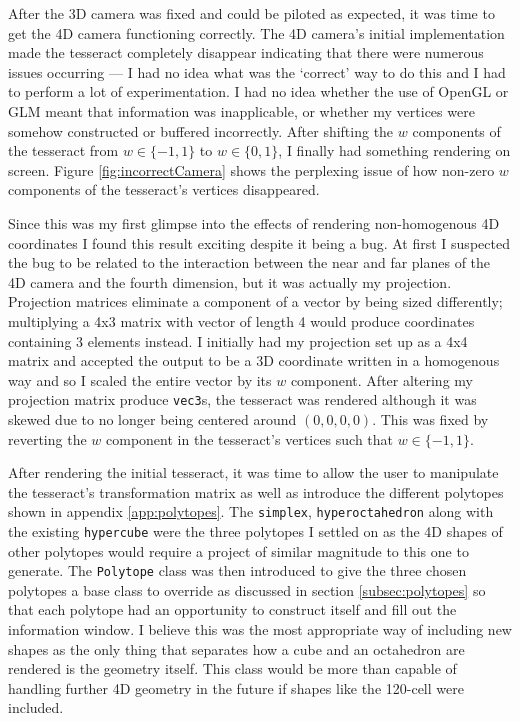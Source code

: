 \documentclass[11pt, a4paper]{article}
\begin{document}
\pagebreak

After the 3D camera was fixed and could be piloted as expected, it was time to get the 4D camera functioning correctly. The 4D camera's initial implementation made the tesseract completely disappear indicating that there were numerous issues occurring --- I had no idea what was the `correct' way to do this and I had to perform a lot of experimentation. I had no idea whether the use of OpenGL or GLM meant that information was inapplicable, or whether my vertices were somehow constructed or buffered incorrectly. After shifting the $w$ components of the tesseract from $w \in \{-1, 1\}$ to $w \in \{0, 1\}$, I finally had something rendering on screen. Figure \ref{fig:incorrectCamera} shows the perplexing issue of how non-zero $w$ components of the tesseract's vertices disappeared.

Since this was my first glimpse into the effects of rendering non-homogenous 4D coordinates I found this result exciting despite it being a bug. At first I suspected the bug to be related to the interaction between the near and far planes of the 4D camera and the fourth dimension, but it was actually my projection. Projection matrices eliminate a component of a vector by being sized differently; multiplying a 4x3 matrix with vector of length 4 would produce coordinates containing 3 elements instead. I initially had my projection set up as a 4x4 matrix and accepted the output to be a 3D coordinate written in a homogenous way and so I scaled the entire vector by its $w$ component. After altering my projection matrix produce \texttt{vec3}s, the tesseract was rendered although it was skewed due to no longer being centered around $(0, 0, 0, 0)$. This was fixed by reverting the $w$ component in the tesseract's vertices such that $w \in \{-1, 1\}$.


\pagebreak

After rendering the initial tesseract, it was time to allow the user to manipulate the tesseract's transformation matrix as well as introduce the different polytopes shown in appendix \ref{app:polytopes}. The \texttt{simplex}, \texttt{hyperoctahedron} along with the existing \texttt{hypercube} were the three polytopes I settled on as the 4D shapes of other polytopes would require a project of similar magnitude to this one to generate. The \texttt{Polytope} class was then introduced to give the three chosen polytopes a base class to override as discussed in section \ref{subsec:polytopes} so that each polytope had an opportunity to construct itself and fill out the information window. I believe this was the most appropriate way of including new shapes as the only thing that separates how a cube and an octahedron are rendered is the geometry itself. This class would be more than capable of handling further 4D geometry in the future if shapes like the 120-cell were included. 
\end{document}

